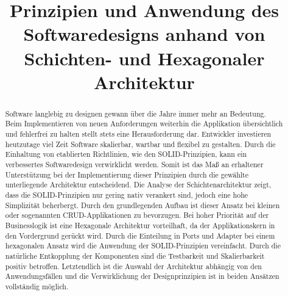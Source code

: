 \documentclass[conference]{IEEEtran}
\begin{document}

\title{Prinzipien und Anwendung des Softwaredesigns anhand von Schichten- und Hexagonaler Architektur}

\author{
}

\maketitle




\begin{abstract}

Software langlebig zu designen gewann über die Jahre immer mehr an Bedeutung. Beim Implementieren von neuen Anforderungen weiterhin die Applikation übersichtlich und fehlerfrei zu halten stellt  stets eine Herausforderung dar. Entwickler investieren heutzutage viel Zeit Software skalierbar, wartbar und flexibel zu gestalten. Durch die Einhaltung von etablierten Richtlinien, wie den SOLID-Prinzipien, kann ein verbessertes Softwaredesign verwirklicht werden. Somit ist das Maß an erhaltener Unterstützung bei der Implementierung dieser Prinzipien durch die gewählte unterliegende Architektur entscheidend. Die Analyse der Schichtenarchitektur zeigt, dass die SOLID-Prinzipien nur gering nativ verankert sind, jedoch eine hohe Simplizität beherbergt. Durch den grundlegenden Aufbau ist dieser Ansatz bei kleinen oder sogenannten CRUD-Applikationen zu bevorzugen. Bei hoher Priorität auf der Businesslogik ist eine Hexagonale Architektur vorteilhaft, da der Applikationskern in den Vordergrund gerückt wird. Durch die Einteilung in Ports und Adapter bei einem hexagonalen Ansatz wird die Anwendung der SOLID-Prinzipien vereinfacht. Durch die natürliche Entkopplung der Komponenten sind die Testbarkeit und Skalierbarkeit positiv betroffen. Letztendlich ist die Auswahl der Architektur abhängig von den Anwendungsfällen und die Verwirklichung der Designprinzipien ist in beiden Ansätzen vollständig möglich. 

\end{abstract}
\end{document}
